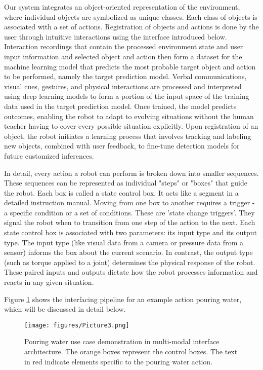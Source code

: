 \documentclass[conference]{IEEEtran}
\begin{document}
Our system integrates an object-oriented representation of the environment, where individual objects are symbolized as unique classes. Each class of objects is associated with a set of actions. Registration of objects and actions is done by the user through intuitive interactions using the interface introduced below. Interaction recordings that contain the processed environment state and user input information and selected object and action then form a dataset for the machine learning model that predicts the most probable target object and action to be performed, namely the target prediction model. Verbal communications, visual cues, gestures, and physical interactions are processed and interpreted using deep learning models to form a portion of the input space of the training data used in the target prediction model. Once trained, the model predicts outcomes, enabling the robot to adapt to evolving situations without the human teacher having to cover every possible situation explicitly. Upon registration of an object, the robot initiates a learning process that involves tracking and labeling new objects, combined with user feedback, to fine-tune detection models for future customized inferences.

In detail, every action a robot can perform is broken down into smaller sequences. These sequences can be represented as individual "steps" or "boxes" that guide the robot. Each box is called a state control box. It acts like a segment in a detailed instruction manual. Moving from one box to another requires a trigger - a specific condition or a set of conditions. These are 'state change triggers'. They signal the robot when to transition from one step of the action to the next. Each state control box is associated with two parameters: its input type and its output type. The input type (like visual data from a camera or pressure data from a sensor) informs the box about the current scenario. In contrast, the output type (such as torque applied to a joint) determines the physical response of the robot. These paired inputs and outputs dictate how the robot processes information and reacts in any given situation.

Figure \ref{fig:control-architecture} shows the interfacing pipeline for an example action pouring water, which will be discussed in detail below. 

\begin{figure}[!htb]
\centering
\texttt{[image: figures/Picture3.png]}
\caption{\label{fig:control-architecture}Pouring water use case demonstration in multi-modal interface architecture. The orange boxes represent the control boxes. The text in red indicate elements specific to the pouring water action.}
\end{figure}
\end{document}
